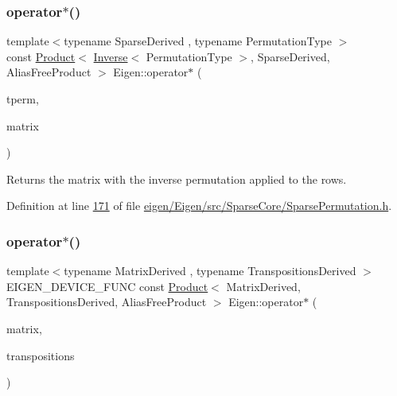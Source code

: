 \subsubsection{\texorpdfstring{operator$\ast$()}{operator*()}\hspace{0.1cm}{\footnotesize\ttfamily [4/9]}}
{\footnotesize\ttfamily template$<$typename Sparse\+Derived , typename Permutation\+Type $>$ \\
const \hyperlink{group___core___module_class_eigen_1_1_product}{Product}$<$ \hyperlink{class_eigen_1_1_inverse}{Inverse}$<$ Permutation\+Type $>$, Sparse\+Derived, Alias\+Free\+Product $>$ Eigen\+::operator$\ast$ (\begin{DoxyParamCaption}\item[{const \hyperlink{class_eigen_1_1_inverse_impl}{Inverse\+Impl}$<$ Permutation\+Type, \hyperlink{struct_eigen_1_1_permutation_storage}{Permutation\+Storage} $>$ \&}]{tperm,  }\item[{const \hyperlink{group___sparse_core___module_class_eigen_1_1_sparse_matrix_base}{Sparse\+Matrix\+Base}$<$ Sparse\+Derived $>$ \&}]{matrix }\end{DoxyParamCaption})\hspace{0.3cm}{\ttfamily [inline]}}

\begin{DoxyReturn}{Returns}
the matrix with the inverse permutation applied to the rows. 
\end{DoxyReturn}


Definition at line \hyperlink{eigen_2_eigen_2src_2_sparse_core_2_sparse_permutation_8h_source_l00171}{171} of file \hyperlink{eigen_2_eigen_2src_2_sparse_core_2_sparse_permutation_8h_source}{eigen/\+Eigen/src/\+Sparse\+Core/\+Sparse\+Permutation.\+h}.

\mbox{\label{namespace_eigen_a8b493da0816bfa75429961b75f21d780}} 
\subsubsection{\texorpdfstring{operator$\ast$()}{operator*()}\hspace{0.1cm}{\footnotesize\ttfamily [5/9]}}
{\footnotesize\ttfamily template$<$typename Matrix\+Derived , typename Transpositions\+Derived $>$ \\
E\+I\+G\+E\+N\+\_\+\+D\+E\+V\+I\+C\+E\+\_\+\+F\+U\+NC const \hyperlink{group___core___module_class_eigen_1_1_product}{Product}$<$ Matrix\+Derived, Transpositions\+Derived, Alias\+Free\+Product $>$ Eigen\+::operator$\ast$ (\begin{DoxyParamCaption}\item[{const \hyperlink{group___core___module_class_eigen_1_1_matrix_base}{Matrix\+Base}$<$ Matrix\+Derived $>$ \&}]{matrix,  }\item[{const \hyperlink{class_eigen_1_1_transpositions_base}{Transpositions\+Base}$<$ Transpositions\+Derived $>$ \&}]{transpositions }\end{DoxyParamCaption})}

